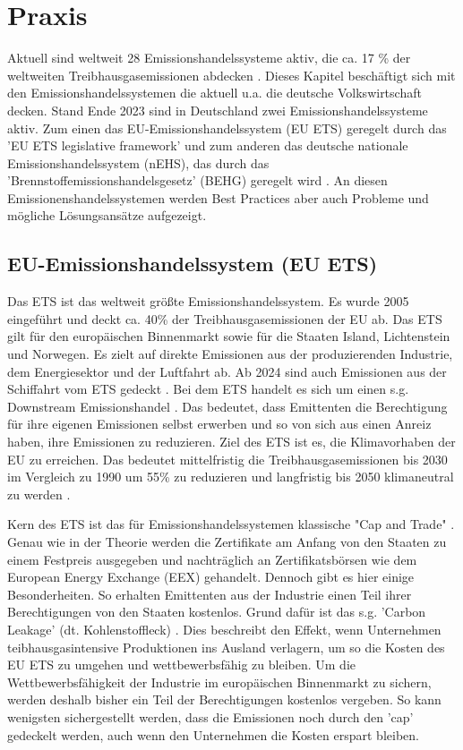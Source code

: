 \chapter{Praxis}

Aktuell sind weltweit 28 Emissionshandelssysteme aktiv, die ca. 17 \% der weltweiten Treibhausgasemissionen abdecken \cite[S. 7]{icap.2023}. 
Dieses Kapitel beschäftigt sich mit den Emissionshandelssystemen die aktuell u.a. die deutsche Volkswirtschaft decken. 
Stand Ende 2023 sind in Deutschland zwei Emissionshandelssysteme aktiv. 
Zum einen das EU-Emissionshandelssystem (EU ETS) geregelt durch das 'EU ETS legislative framework' \cite{eu.2023} und zum anderen das deutsche nationale Emissionshandelssystem (nEHS), das durch das 'Brennstoffemissionshandelsgesetz' (BEHG) geregelt wird \cite{dehst.2023}.
An diesen Emissionenshandelssystemen werden Best Practices aber auch Probleme und mögliche Lösungsansätze aufgezeigt.

\section{EU-Emissionshandelssystem (EU ETS)}

Das ETS ist das weltweit größte Emissionshandelssystem. Es wurde 2005 eingeführt und deckt ca. 40\% der Treibhausgasemissionen der EU ab. Das ETS gilt für den europäischen Binnenmarkt sowie für die Staaten Island, Lichtenstein und Norwegen. 
Es zielt auf direkte Emissionen aus der produzierenden Industrie, dem Energiesektor und der Luftfahrt ab. Ab 2024 sind auch Emissionen aus der Schiffahrt vom ETS gedeckt \cite{eu.2023}.
Bei dem ETS handelt es sich um einen s.g. Downstream Emissionshandel \cite{dehst.2023}. 
Das bedeutet, dass Emittenten die Berechtigung für ihre eigenen Emissionen selbst erwerben und so von sich aus einen Anreiz haben, ihre Emissionen zu reduzieren. Ziel des ETS ist es, die Klimavorhaben der EU zu erreichen. 
Das bedeutet mittelfristig die Treibhausgasemissionen bis 2030 im Vergleich zu 1990 um 55\% zu reduzieren und langfristig bis 2050 klimaneutral zu werden \cite{eu.2023}. 

Kern des ETS ist das für Emissionshandelssystemen klassische "Cap and Trade" \cite{eu.2023}. Genau wie in der Theorie werden die Zertifikate am Anfang von den Staaten zu einem Festpreis ausgegeben und nachträglich an Zertifikatsbörsen wie dem European Energy Exchange (EEX) gehandelt. 
Dennoch gibt es hier einige Besonderheiten. So erhalten Emittenten aus der Industrie einen Teil ihrer Berechtigungen von den Staaten kostenlos. 
Grund dafür ist das s.g. 'Carbon Leakage' (dt. Kohlenstoffleck) \cite{eu2.2023}.
Dies beschreibt den Effekt, wenn Unternehmen teibhausgasintensive Produktionen ins Ausland verlagern, um so die Kosten des EU ETS zu umgehen und wettbewerbsfähig zu bleiben. 
Um die Wettbewerbsfähigkeit der Industrie im europäischen Binnenmarkt zu sichern, werden deshalb bisher ein Teil der Berechtigungen kostenlos vergeben. 
So kann wenigsten sichergestellt werden, dass die Emissionen noch durch den 'cap' gedeckelt werden, auch wenn den Unternehmen die Kosten erspart bleiben.

